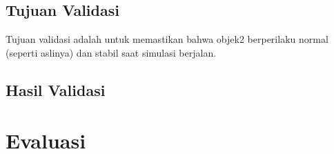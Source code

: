 \subsection{Tujuan Validasi}

Tujuan validasi adalah untuk memastikan bahwa objek2 berperilaku normal (seperti
aslinya) dan stabil saat simulasi berjalan.


\subsection{Hasil Validasi}

\section{Evaluasi}
